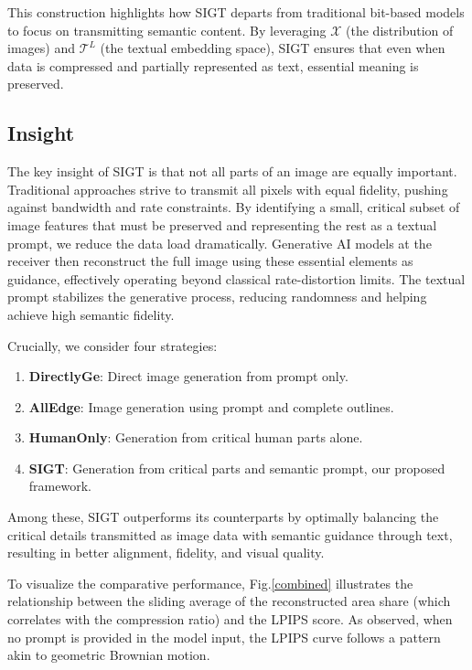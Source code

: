 \documentclass[conference]{IEEEtran}
\begin{document}
This construction highlights how SIGT departs from traditional bit-based models to focus on transmitting semantic content. By leveraging $\mathcal{X}$ (the distribution of images) and $\mathcal{T}^{L}$ (the textual embedding space), SIGT ensures that even when data is compressed and partially represented as text, essential meaning is preserved.

\subsection{Insight}\label{Baseline choose}

The key insight of SIGT is that not all parts of an image are equally important. Traditional approaches strive to transmit all pixels with equal fidelity, pushing against bandwidth and rate constraints. By identifying a small, critical subset of image features that must be preserved and representing the rest as a textual prompt, we reduce the data load dramatically. Generative AI models at the receiver then reconstruct the full image using these essential elements as guidance, effectively operating beyond classical rate-distortion limits. The textual prompt stabilizes the generative process, reducing randomness and helping achieve high semantic fidelity.

Crucially, we consider four strategies:
\begin{enumerate}
    \item \textbf{DirectlyGe}: Direct image generation from prompt only.
    \item \textbf{AllEdge}: Image generation using prompt and complete outlines.
    \item \textbf{HumanOnly}: Generation from critical human parts alone.
    \item \textbf{SIGT}: Generation from critical parts and semantic prompt, our proposed framework.
\end{enumerate}

Among these, SIGT outperforms its counterparts by optimally balancing the critical details transmitted as image data with semantic guidance through text, resulting in better alignment, fidelity, and visual quality.


To visualize the comparative performance, Fig.\ref{combined} illustrates the relationship between the sliding average of the reconstructed area share (which correlates with the compression ratio) and the LPIPS score. As observed, when no prompt is provided in the model input, the LPIPS curve follows a pattern akin to geometric Brownian motion.
\end{document}
